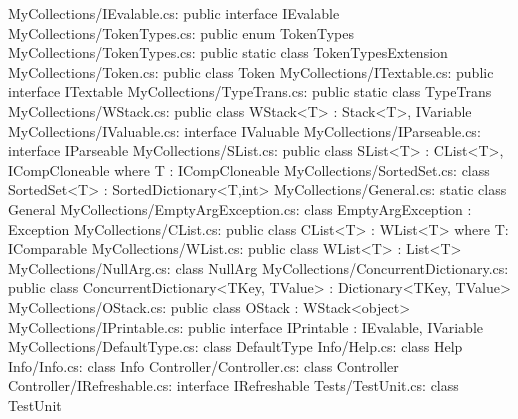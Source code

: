 MyCollections/IEvalable.cs:	public interface IEvalable 
MyCollections/TokenTypes.cs:	public enum TokenTypes 
MyCollections/TokenTypes.cs:	public static class TokenTypesExtension 
MyCollections/Token.cs:	public class Token 
MyCollections/ITextable.cs:	public interface ITextable 
MyCollections/TypeTrans.cs:	public static class TypeTrans 
MyCollections/WStack.cs:	public class WStack<T> : Stack<T>, IVariable 
MyCollections/IValuable.cs:	interface IValuable 
MyCollections/IParseable.cs:	interface IParseable 
MyCollections/SList.cs:	public class SList<T> : CList<T>, ICompCloneable where T : ICompCloneable 
MyCollections/SortedSet.cs:	class SortedSet<T> : SortedDictionary<T,int> 
MyCollections/General.cs:	static class General 
MyCollections/EmptyArgException.cs:	class EmptyArgException : Exception 
MyCollections/CList.cs:	public class CList<T> : WList<T> where T: IComparable 
MyCollections/WList.cs:	public class WList<T> : List<T> 
MyCollections/NullArg.cs:	class NullArg 
MyCollections/ConcurrentDictionary.cs:	public class ConcurrentDictionary<TKey, TValue> : Dictionary<TKey, TValue> 
MyCollections/OStack.cs:	public class OStack : WStack<object> 
MyCollections/IPrintable.cs:	public interface IPrintable : IEvalable, IVariable 
MyCollections/DefaultType.cs:	class DefaultType 
Info/Help.cs:	class Help 
Info/Info.cs:	class Info 
Controller/Controller.cs:	class Controller 
Controller/IRefreshable.cs:	interface IRefreshable 
Tests/TestUnit.cs:	class TestUnit 
